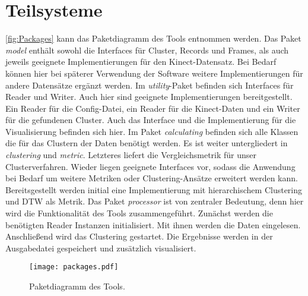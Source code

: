 \section{Teilsysteme}
\label{4-Teilsysteme}
\autoref{fig:Packages} kann das Paketdiagramm des Tools entnommen werden.
Das Paket \emph{model} enthält sowohl die Interfaces für Cluster, Records und Frames,
als auch jeweils geeignete Implementierungen für den Kinect-Datensatz.
Bei Bedarf können hier bei späterer Verwendung der Software weitere Implementierungen
für andere Datensätze ergänzt werden.
Im \emph{utility}-Paket befinden sich Interfaces für Reader und Writer.
Auch hier sind geeignete Implementierungen bereitgestellt.
Ein Reader für die Config-Datei, ein Reader für die Kinect-Daten
und ein Writer für die gefundenen Cluster.
Auch das Interface und die Implementierung für die Visualisierung befinden sich hier.
Im Paket \emph{calculating} befinden sich alle Klassen die für das Clustern der Daten benötigt werden.
Es ist weiter untergliedert in \emph{clustering} und \emph{metric}.
Letzteres liefert die Vergleichsmetrik für unser Clusterverfahren.
Wieder liegen geeignete Interfaces vor,
sodass die Anwendung bei Bedarf um weitere Metriken oder Clustering-Ansätze erweitert werden kann.
Bereitsgestellt werden initial eine Implementierung mit hierarchischem Clustering
und \ac{DTW} als Metrik.
Das Paket \emph{processor} ist von zentraler Bedeutung,
denn hier wird die Funktionalität des Tools zusammengeführt.
Zunächst werden die benötigten Reader Instanzen initialisiert.
Mit ihnen werden die Daten eingelesen.
Anschließend wird das Clustering gestartet.
Die Ergebnisse werden in der Ausgabedatei gespeichert und zusätzlich visualisiert.
\begin{figure}[ht]
    \begin{center}
    \texttt{[image: packages.pdf]}
    \end{center}
    \caption{Paketdiagramm des Tools.}
    \label{fig:Packages}
\end{figure}

\clearpage
